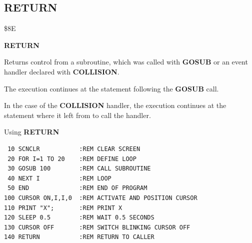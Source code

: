 \subsection{RETURN}
\begin{description}[leftmargin=2cm,style=nextline]
\item [Token:] \$8E
\item [Format:] {\bf RETURN}
\item [Usage:]  Returns control from a subroutine, which
                was called with {\bf GOSUB} or an event
                handler declared with {\bf COLLISION}.

                The execution continues at the statement
                following the {\bf GOSUB} call.

                In the case of the {\bf COLLISION} handler,
                the execution continues at the statement
                where it left from to call the handler.

\item [Example:] Using {\bf RETURN}

\begin{tcolorbox}[colback=black,coltext=white]
\verbatimfont{\codefont}
\begin{verbatim}
 10 SCNCLR           :REM CLEAR SCREEN
 20 FOR I=1 TO 20    :REM DEFINE LOOP
 30 GOSUB 100        :REM CALL SUBROUTINE
 40 NEXT I           :REM LOOP
 50 END              :REM END OF PROGRAM
100 CURSOR ON,I,I,0  :REM ACTIVATE AND POSITION CURSOR
110 PRINT "X";       :REM PRINT X
120 SLEEP 0.5        :REM WAIT 0.5 SECONDS
130 CURSOR OFF       :REM SWITCH BLINKING CURSOR OFF
140 RETURN           :REM RETURN TO CALLER
\end{verbatim}
\end{tcolorbox}
\end{description}


\newpage
